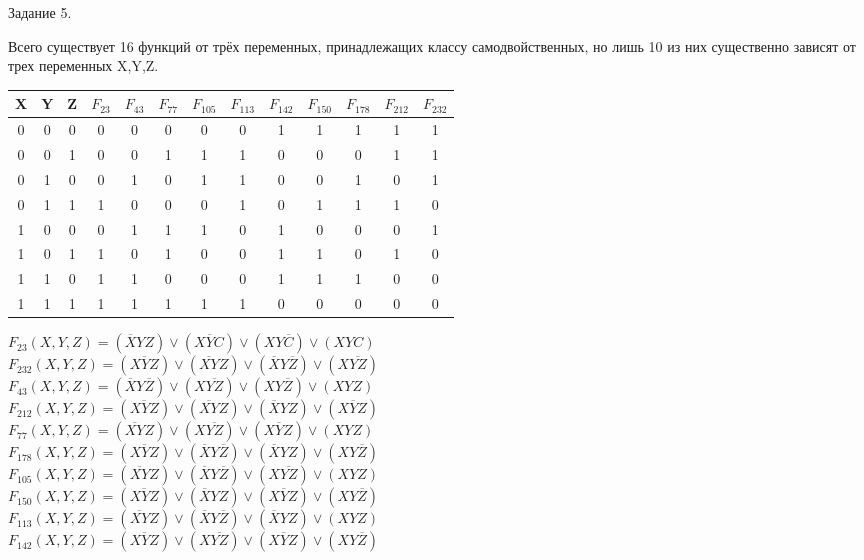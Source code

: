 \documentclass[a4paper,12pt]{report} %
\begin{document}
\bigskip

\newpage
\begin{center}
	Задание 5.\\
\end{center}

\begin{flushleft}
	Всего существует 16 функций от трёх переменных, принадлежащих классу самодвойственных, но лишь 10 из них
	существенно зависят от трех переменных X,Y,Z.\\
	\bigskip
	
	\begin{tabular}{| c | c | c | c | c | c | c | c | c | c | c | c | c |}
	\hline
	X & Y & Z & $F_{23}$ & $F_{43}$ & $F_{77}$ & $F_{105}$ & $F_{113}$ & $F_{142}$ & $F_{150}$ & $F_{178}$ & $F_{212}$ & $F_{232}$\\
	\hline
	0 & 0 & 0 & 0 & 0 & 0 & 0 & 0 & 1 & 1 & 1 & 1 & 1\\
	\hline
	0 & 0 & 1 & 0 & 0 & 1 & 1 & 1 & 0 & 0 & 0 & 1 & 1\\
	\hline
	0 & 1 & 0 & 0 & 1 & 0 & 1 & 1 & 0 & 0 & 1 & 0 & 1\\
	\hline
	0 & 1 & 1 & 1 & 0 & 0 & 0 & 1 & 0 & 1 & 1 & 1 & 0\\
	\hline
	1 & 0 & 0 & 0 & 1 & 1 & 1 & 0 & 1 & 0 & 0 & 0 & 1\\
	\hline
	1 & 0 & 1 & 1 & 0 & 1 & 0 & 0 & 1 & 1 & 0 & 1 & 0\\
	\hline
	1 & 1 & 0 & 1 & 1 & 0 & 0 & 0 & 1 & 1 & 1 & 0 & 0\\
	\hline
	1 & 1 & 1 & 1 & 1 & 1 & 1 & 1 & 0 & 0 & 0 & 0 & 0\\
	\hline
	\end{tabular}
	\bigskip
	
	$F_{23}(X,Y,Z)=(\overline{X}YZ) \vee (X\overline{Y}C) \vee (XY\overline{C}) \vee (XYC)$\\
	$F_{232}(X,Y,Z)=(\overline{XYZ}) \vee (\overline{XY}Z) \vee (\overline{X}Y\overline{Z}) \vee (X\overline{YZ})$\\
	$F_{43}(X,Y,Z)=(\overline{X}Y\overline{Z}) \vee (X\overline{YZ}) \vee (XY\overline{Z}) \vee (XYZ)$\\
	$F_{212}(X,Y,Z)=(\overline{XYZ}) \vee (\overline{XY}Z) \vee (\overline{X}YZ) \vee (X\overline{Y}Z)$\\
	$F_{77}(X,Y,Z)=(\overline{XY}Z) \vee (X\overline{YZ}) \vee (X\overline{Y}Z) \vee (XYZ)$\\
	$F_{178}(X,Y,Z)=(\overline{XYZ}) \vee (\overline{X}Y\overline{Z}) \vee (\overline{X}YZ) \vee (XY\overline{Z})$\\
	$F_{105}(X,Y,Z)=(\overline{XY}Z) \vee (\overline{X}Y\overline{Z}) \vee (X\overline{YZ})\vee (XYZ)$\\
	$F_{150}(X,Y,Z)=(\overline{XYZ}) \vee (\overline{X}YZ) \vee (X\overline{Y}Z) \vee (XY\overline{Z})$\\
	$F_{113}(X,Y,Z)=(\overline{XY}Z) \vee (\overline{X}Y\overline{Z}) \vee (\overline{X}YZ) \vee (XYZ)$\\
	$F_{142}(X,Y,Z)=(\overline{XYZ}) \vee (X\overline{YZ}) \vee (X\overline{Y}Z) \vee (XY\overline{Z})$\\
\end{flushleft}
\end{document}
